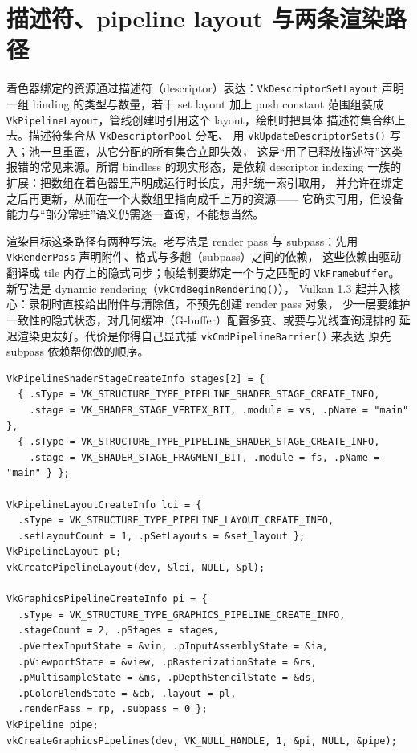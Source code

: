 \documentclass[12pt,a4paper,fontset=fandol]{ctexbook}
\newcommand{\Fn}[1]{\texttt{#1()}}
\newcommand{\Tp}[1]{\texttt{#1}}
\newcommand{\Bk}{\discretionary{}{}{}}
\begin{document}
\section{描述符、pipeline layout 与两条渲染路径}

着色器绑定的资源通过描述符（descriptor）表达：\Tp{Vk\Bk Descriptor\Bk Set\Bk Layout}
声明一组 binding 的类型与数量，若干 set layout 加上 push constant 范围组装成
\Tp{Vk\Bk Pipeline\Bk Layout}，管线创建时引用这个 layout，绘制时把具体
描述符集合绑上去。描述符集合从 \Tp{Vk\Bk Descriptor\Bk Pool} 分配、
用 \Fn{vkUpdate\Bk Descriptor\Bk Sets} 写入；池一旦重置，从它分配的所有集合立即失效，
这是``用了已释放描述符''这类报错的常见来源。所谓 bindless 的现实形态，是依赖
descriptor indexing 一族的扩展：把数组在着色器里声明成运行时长度，用非统一索引取用，
并允许在绑定之后再更新，从而在一个大数组里指向成千上万的资源——
它确实可用，但设备能力与``部分常驻''语义仍需逐一查询，不能想当然。

渲染目标这条路径有两种写法。老写法是 render pass 与 subpass：先用
\Tp{Vk\Bk Render\Bk Pass} 声明附件、格式与多趟（subpass）之间的依赖，
这些依赖由驱动翻译成 tile 内存上的隐式同步；帧绘制要绑定一个与之匹配的
\Tp{Vk\Bk Framebuffer}。新写法是 dynamic rendering（\Fn{vkCmd\Bk Begin\Bk Rendering}），
Vulkan 1.3 起并入核心：录制时直接给出附件与清除值，不预先创建 render pass 对象，
少一层要维护一致性的隐式状态，对几何缓冲（G-buffer）配置多变、或要与光线查询混排的
延迟渲染更友好。代价是你得自己显式插 \Fn{vkCmd\Bk Pipeline\Bk Barrier} 来表达
原先 subpass 依赖帮你做的顺序。

\begin{lstlisting}[style=cstyle,caption={pipeline layout 组装与图形管线创建},label={lst:ch09-pipeline}]
VkPipelineShaderStageCreateInfo stages[2] = {
  { .sType = VK_STRUCTURE_TYPE_PIPELINE_SHADER_STAGE_CREATE_INFO,
    .stage = VK_SHADER_STAGE_VERTEX_BIT, .module = vs, .pName = "main" },
  { .sType = VK_STRUCTURE_TYPE_PIPELINE_SHADER_STAGE_CREATE_INFO,
    .stage = VK_SHADER_STAGE_FRAGMENT_BIT, .module = fs, .pName = "main" } };

VkPipelineLayoutCreateInfo lci = {
  .sType = VK_STRUCTURE_TYPE_PIPELINE_LAYOUT_CREATE_INFO,
  .setLayoutCount = 1, .pSetLayouts = &set_layout };
VkPipelineLayout pl;
vkCreatePipelineLayout(dev, &lci, NULL, &pl);

VkGraphicsPipelineCreateInfo pi = {
  .sType = VK_STRUCTURE_TYPE_GRAPHICS_PIPELINE_CREATE_INFO,
  .stageCount = 2, .pStages = stages,
  .pVertexInputState = &vin, .pInputAssemblyState = &ia,
  .pViewportState = &view, .pRasterizationState = &rs,
  .pMultisampleState = &ms, .pDepthStencilState = &ds,
  .pColorBlendState = &cb, .layout = pl,
  .renderPass = rp, .subpass = 0 };
VkPipeline pipe;
vkCreateGraphicsPipelines(dev, VK_NULL_HANDLE, 1, &pi, NULL, &pipe);
\end{lstlisting}
\end{document}

